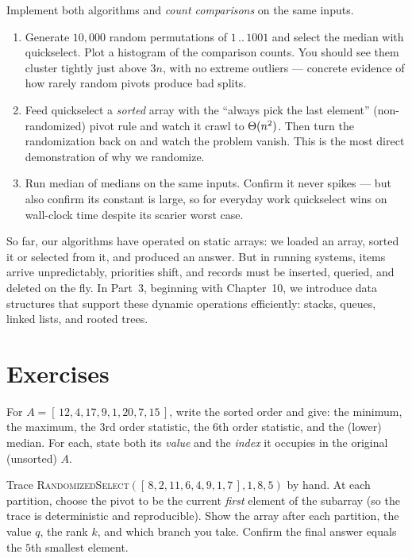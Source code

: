\begin{labbox}
Implement both algorithms and \emph{count comparisons} on the same inputs.
\begin{enumerate}
  \item Generate $10{,}000$ random permutations of $1\,..\,1001$ and select the
    median with quickselect. Plot a histogram of the comparison counts. You should
    see them cluster tightly just above $3n$, with no extreme outliers --- concrete
    evidence of how rarely random pivots produce bad splits.
  \item Feed quickselect a \emph{sorted} array with the ``always pick the last
    element'' (non-randomized) pivot rule and watch it crawl to $\Theta(n^2)$. Then
    turn the randomization back on and watch the problem vanish. This is the most
    direct demonstration of why we randomize.
  \item Run median of medians on the same inputs. Confirm it never spikes --- but
    also confirm its constant is large, so for everyday work quickselect wins on
    wall-clock time despite its scarier worst case.
\end{enumerate}
\end{labbox}

So far, our algorithms have operated on static arrays: we loaded
an array, sorted it or selected from it, and produced an answer. But in
running systems, items arrive unpredictably, priorities shift, and records
must be inserted, queried, and deleted on the fly. In Part~3, beginning with
Chapter~10, we introduce data structures that support these dynamic
operations efficiently: stacks, queues, linked lists, and rooted trees.

\section{Exercises}

\begin{exercise}\label{ch09:ex-rank-vs-index}
For $A = [\,12, 4, 17, 9, 1, 20, 7, 15\,]$, write the sorted order and give: the
minimum, the maximum, the $3$rd order statistic, the $6$th order statistic, and the
(lower) median. For each, state both its \emph{value} and the \emph{index} it
occupies in the original (unsorted) $A$.
\end{exercise}

\begin{exercise}\label{ch09:ex-trace}
Trace \textsc{RandomizedSelect}$([\,8, 2, 11, 6, 4, 9, 1, 7\,], 1, 8, 5)$ by hand.
At each partition, choose the pivot to be the current \emph{first} element of the
subarray (so the trace is deterministic and reproducible). Show the array after each
partition, the value $q$, the rank $k$, and which branch you take. Confirm the final
answer equals the $5$th smallest element.
\end{exercise}

